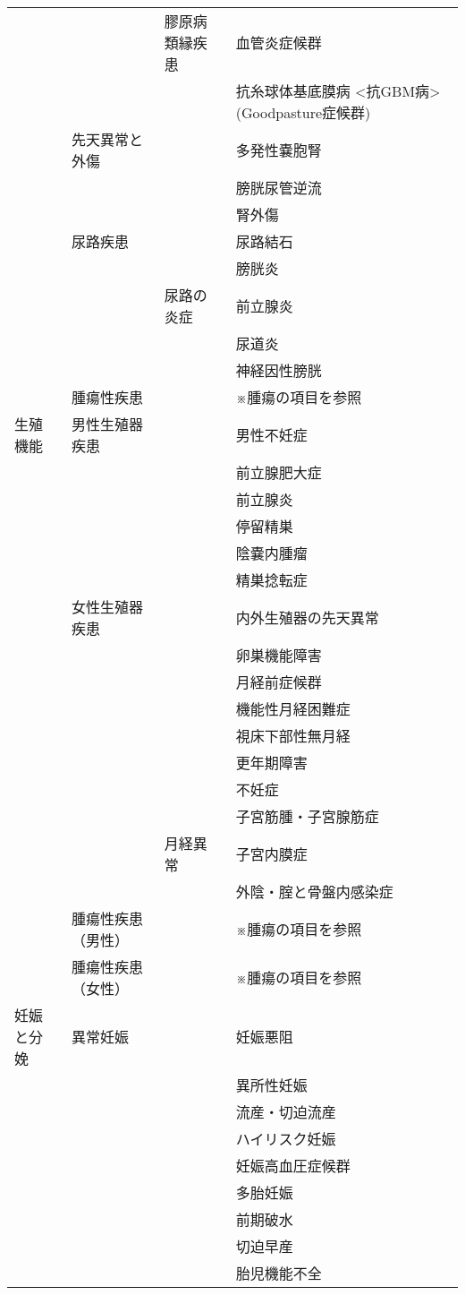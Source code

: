 \begin{xltabular}{\linewidth}{XXXX}
 &  & 膠原病類縁疾患 & 血管炎症候群 \\
 &  &  & 抗糸球体基底膜病 <抗GBM病> (Goodpasture症候群) \\
 & 先天異常と外傷 &  & 多発性嚢胞腎 \\
 &  &  & 膀胱尿管逆流 \\
 &  &  & 腎外傷 \\
 & 尿路疾患 &  & 尿路結石 \\
 &  &  & 膀胱炎 \\
 &  & 尿路の炎症 & 前立腺炎 \\
 &  &  & 尿道炎 \\
 &  &  & 神経因性膀胱 \\
 & 腫瘍性疾患 &  & ※腫瘍の項目を参照 \\
生殖機能 & 男性生殖器疾患 &  & 男性不妊症 \\
 &  &  & 前立腺肥大症 \\
 &  &  & 前立腺炎 \\
 &  &  & 停留精巣 \\
 &  &  & 陰嚢内腫瘤 \\
 &  &  & 精巣捻転症 \\
 & 女性生殖器疾患 &  & 内外生殖器の先天異常 \\
 &  &  & 卵巣機能障害 \\
 &  &  & 月経前症候群 \\
 &  &  & 機能性月経困難症 \\
 &  &  & 視床下部性無月経 \\
 &  &  & 更年期障害 \\
 &  &  & 不妊症 \\
 &  &  & 子宮筋腫・子宮腺筋症 \\
 &  & 月経異常 & 子宮内膜症 \\
 &  &  & 外陰・腟と骨盤内感染症 \\
 & 腫瘍性疾患（男性） &  & ※腫瘍の項目を参照 \\
 & 腫瘍性疾患（女性） &  & ※腫瘍の項目を参照 \\
妊娠と分娩 & 異常妊娠 &  & 妊娠悪阻 \\
 &  &  & 異所性妊娠 \\
 &  &  & 流産・切迫流産 \\
 &  &  & ハイリスク妊娠 \\
 &  &  & 妊娠高血圧症候群 \\
 &  &  & 多胎妊娠 \\
 &  &  & 前期破水 \\
 &  &  & 切迫早産 \\
 &  &  & 胎児機能不全 \\

\end{xltabular}
